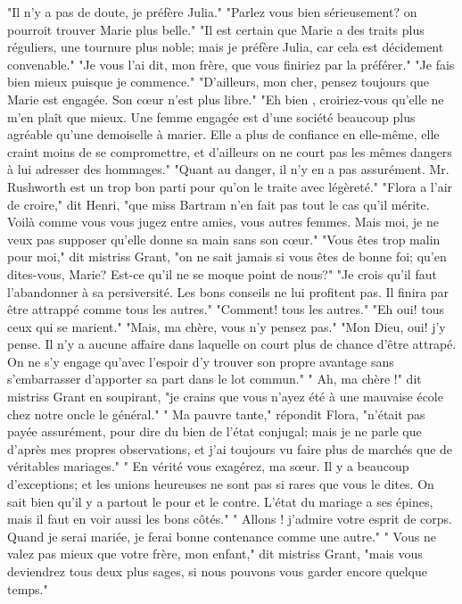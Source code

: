 "Il n'y a pas de doute, je préfère Julia."
"Parlez vous bien sérieusement? on pourroit trouver Marie plus belle."
"Il est certain que Marie a des traits plus réguliers, une tournure plus noble; mais je préfère Julia, car cela est décidement convenable."
"Je vous l'ai dit, mon frère, que vous finiriez par la préférer."
"Je fais bien mieux puisque je commence."
"D'ailleurs, mon cher, pensez toujours que Marie est engagée. Son cœur n'est plus libre."
"Eh bien , croiriez-vous qu'elle ne m'en plaît que mieux. Une femme engagée est d'une\setcounter{page}{509} société beaucoup plus agréable qu'une demoiselle à marier. Elle a plus de confiance en elle-même, elle craint moins de se compromettre, et d'ailleurs on ne court pas les mêmes dangers à lui adresser des hommages."
"Quant au danger, il n'y en a pas assurément. Mr. Rushworth est un trop bon parti pour qu'on le traite avec légèreté."
"Flora a l'air de croire," dit Henri, "que miss Bartram n'en fait pas tout le cas qu'il mérite. Voilà comme vous vous jugez entre amies, vous autres femmes. Mais moi, je ne veux pas supposer qu'elle donne sa main sans son cœur."
"Vous êtes trop malin pour moi," dit mistriss Grant, "on ne sait jamais si vous êtes de bonne foi; qu'en dites-vous, Marie? Est-ce qu'il ne se moque point de nous?"
"Je crois qu'il faut l'abandonner à sa persiversité. Les bons conseils ne lui profitent pas. Il finira par être attrappé comme tous les autres."
"Comment! tous les autres."
"Eh oui! tous ceux qui se marient."
"Mais, ma chère, vous n'y pensez pas."
"Mon Dieu, oui! j'y pense. Il n'y a aucune affaire dans laquelle on court plus de\setcounter{page}{510} chance d'être attrapé. On ne s'y engage qu'avec l'espoir d'y trouver son propre avantage sans s'embarrasser d'apporter sa part dans le lot commun."
" Ah, ma chère !" dit mistriss Grant en soupirant, "je crains que vous n'ayez été à une mauvaise école chez notre oncle le général."
" Ma pauvre tante," répondit Flora, "n'était pas payée assurément, pour dire du bien de l'état conjugal; mais je ne parle que d'après mes propres observations, et j'ai toujours vu faire plus de marchés que de véritables mariages."
" En vérité vous exagérez, ma sœur. Il y a beaucoup d'exceptions; et les unions heureuses ne sont pas si rares que vous le dites. On sait bien qu'il y a partout le pour et le contre. L'état du mariage a ses épines, mais il faut en voir aussi les bons côtés."
" Allons ! j'admire votre esprit de corps. Quand je serai mariée, je ferai bonne contenance comme une autre."
" Vous ne valez pas mieux que votre frère, mon enfant," dit mistriss Grant, "mais vous deviendrez tous deux plus sages, si nous pouvons vous garder encore quelque temps."
